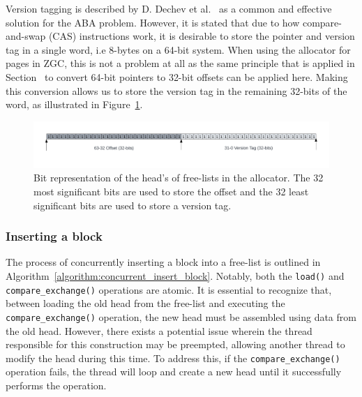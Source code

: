Version tagging is described by D. Dechev et al.~\cite{bjarne_aba} as a common and effective solution for the ABA problem. However, it is stated that due to how compare-and-swap (CAS) instructions work, it is desirable to store the pointer and version tag in a single word, i.e 8-bytes on a 64-bit system. When using the allocator for pages in ZGC, this is not a problem at all as the same principle that is applied in Section~\cite{sec:adaptations_impl:0-byte-header} to convert 64-bit pointers to 32-bit offsets can be applied here. Making this conversion allows us to store the version tag in the remaining 32-bits of the word, as illustrated in Figure~\ref{fig:concurrent_head_bits}.

\begin{figure}[H]
    \centering
    \includegraphics[width=1\textwidth]{figures/concurrent_head_bits.png}
    \caption{Bit representation of the head's of free-lists in the allocator. The 32 most significant bits are used to store the offset and the 32 least significant bits are used to store a version tag.}
    \label{fig:concurrent_head_bits}
\end{figure}

\subsubsection{Inserting a block}

The process of concurrently inserting a block into a free-list is outlined in Algorithm~\ref{algorithm:concurrent_insert_block}. Notably, both the \texttt{load()} and \texttt{compare\_exchange()} operations are atomic. It is essential to recognize that, between loading the old head from the free-list and executing the \texttt{compare\_exchange()} operation, the new head must be assembled using data from the old head. However, there exists a potential issue wherein the thread responsible for this construction may be preempted, allowing another thread to modify the head during this time. To address this, if the \texttt{compare\_exchange()} operation fails, the thread will loop and create a new head until it successfully performs the operation.

